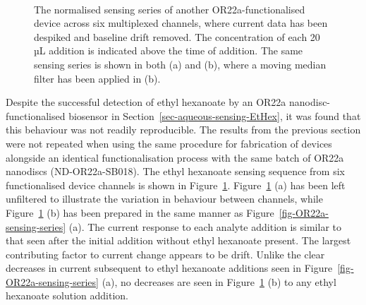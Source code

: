 \documentclass[
  a4paper,
]{scrbook}
\begin{document}
\begin{figure}
\begin{minipage}[t]{0.70\linewidth}
{{}

}

\end{minipage}%
%
\begin{minipage}[t]{0.15\linewidth}

{\centering 

~

}

\end{minipage}%

\caption{\label{fig-OR22a-variability}The normalised sensing series of
another OR22a-functionalised device across six multiplexed channels,
where current data has been despiked and baseline drift removed. The
concentration of each 20 µL addition is indicated above the time of
addition. The same sensing series is shown in both (a) and (b), where a
moving median filter has been applied in (b).}

\end{figure}

Despite the successful detection of ethyl hexanoate by an OR22a
nanodisc-functionalised biosensor in
Section~\ref{sec-aqueous-sensing-EtHex}, it was found that this
behaviour was not readily reproducible. The results from the previous
section were not repeated when using the same procedure for fabrication
of devices alongside an identical functionalisation process with the
same batch of OR22a nanodiscs (ND-OR22a-SB018). The ethyl hexanoate
sensing sequence from six functionalised device channels is shown in
Figure~\ref{fig-OR22a-variability}. Figure~\ref{fig-OR22a-variability}
(a) has been left unfiltered to illustrate the variation in behaviour
between channels, while Figure~\ref{fig-OR22a-variability} (b) has been
prepared in the same manner as Figure~\ref{fig-OR22a-sensing-series}
(a). The current response to each analyte addition is similar to that
seen after the initial addition without ethyl hexanoate present. The
largest contributing factor to current change appears to be drift.
Unlike the clear decreases in current subsequent to ethyl hexanoate
additions seen in Figure~\ref{fig-OR22a-sensing-series} (a), no
decreases are seen in Figure~\ref{fig-OR22a-variability} (b) to any
ethyl hexanoate solution addition.
\end{document}
